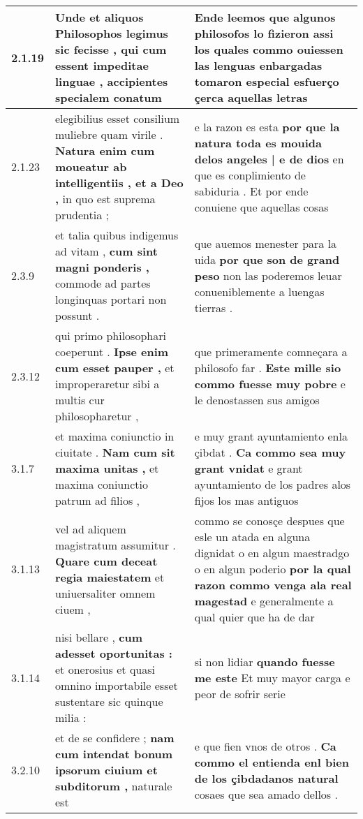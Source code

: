 \begin{tabular}{|p{1cm}|p{6.5cm}|p{6.5cm}|}
2.1.19 & Unde et aliquos Philosophos legimus sic fecisse , \textbf{ qui cum essent impeditae linguae , } accipientes specialem conatum & Ende leemos que algunos philosofos lo fizieron \textbf{ assi los quales commo ouiessen las lenguas enbargadas } tomaron especial esfuerço çerca aquellas letras \\\hline
2.1.23 & elegibilius esset consilium muliebre quam virile . \textbf{ Natura enim cum moueatur ab intelligentiis , et a Deo , } in quo est suprema prudentia ; & e la razon es esta \textbf{ por que la natura toda es mouida delos angeles | e de dios } en que es conplimiento de sabiduria . Et por ende conuiene que aquellas cosas \\\hline
2.3.9 & et talia quibus indigemus ad vitam , \textbf{ cum sint magni ponderis , } commode ad partes longinquas portari non possunt . & que auemos menester para la uida \textbf{ por que son de grand peso } non las poderemos leuar conueniblemente a luengas tierras . \\\hline
2.3.12 & qui primo philosophari coeperunt . \textbf{ Ipse enim cum esset pauper , } et improperaretur sibi a multis cur philosopharetur , & que primeramente comneçara a philosofo far . \textbf{ Este mille sio commo fuesse muy pobre } e le denostassen sus amigos \\\hline
3.1.7 & et maxima coniunctio in ciuitate . \textbf{ Nam cum sit maxima unitas , } et maxima coniunctio patrum ad filios , & e muy grant ayuntamiento enla çibdat . \textbf{ Ca commo sea muy grant vnidat } e grant ayuntamiento de los padres alos fijos los mas antiguos \\\hline
3.1.13 & vel ad aliquem magistratum assumitur . \textbf{ Quare cum deceat regia maiestatem } et uniuersaliter omnem ciuem , & commo se conosçe despues que esle un atada en alguna dignidat o en algun maestradgo o en algun poderio \textbf{ por la qual razon commo venga ala real magestad } e generalmente a qual quier que ha de dar \\\hline
3.1.14 & nisi bellare , \textbf{ cum adesset oportunitas : } et onerosius et quasi omnino importabile esset sustentare sic quinque milia : & si non lidiar \textbf{ quando fuesse me este } Et muy mayor carga e peor de sofrir serie \\\hline
3.2.10 & et de se confidere ; \textbf{ nam cum intendat bonum ipsorum ciuium et subditorum , } naturale est & e que fien vnos de otros . \textbf{ Ca commo el entienda enl bien de los çibdadanos natural } cosaes que sea amado dellos . \\\hline

\end{tabular}

